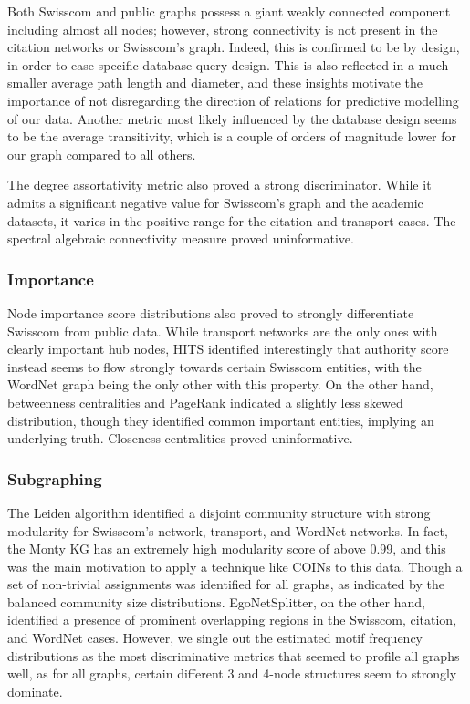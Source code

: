 Both Swisscom and public graphs possess a giant weakly connected component including almost all nodes; however, strong connectivity is not present in the citation networks or Swisscom's graph. Indeed, this is confirmed to be by design, in order to ease specific database query design. This is also reflected in a much smaller average path length and diameter, and these insights motivate the importance of not disregarding the direction of relations for predictive modelling of our data. Another metric most likely influenced by the database design seems to be the average transitivity, which is a couple of orders of magnitude lower for our graph compared to all others. 

The degree assortativity metric also proved a strong discriminator. While it admits a significant negative value for Swisscom's graph and the academic datasets, it varies in the positive range for the citation and transport cases. The spectral algebraic connectivity measure proved uninformative.

\subsubsection{Importance} 
Node importance score distributions also proved to strongly differentiate Swisscom from public data. While transport networks are the only ones with clearly important hub nodes, HITS identified interestingly that authority score instead seems to flow strongly towards certain Swisscom entities, with the WordNet graph being the only other with this property. On the other hand, betweenness centralities and PageRank indicated a slightly less skewed distribution, though they identified common important entities, implying an underlying truth. Closeness centralities proved uninformative.

\subsubsection{Subgraphing} The Leiden algorithm identified a disjoint community structure with strong modularity for Swisscom's network, transport, and WordNet networks. In fact, the Monty KG has an extremely high modularity score of above 0.99, and this was the main motivation to apply a technique like COINs to this data. Though a set of non-trivial assignments was identified for all graphs, as indicated by the balanced community size distributions. EgoNetSplitter, on the other hand, identified a presence of prominent overlapping regions in the Swisscom, citation, and WordNet cases. However, we single out the estimated motif frequency distributions as the most discriminative metrics that seemed to profile all graphs well, as for all graphs, certain different 3 and 4-node structures seem to strongly dominate. 

